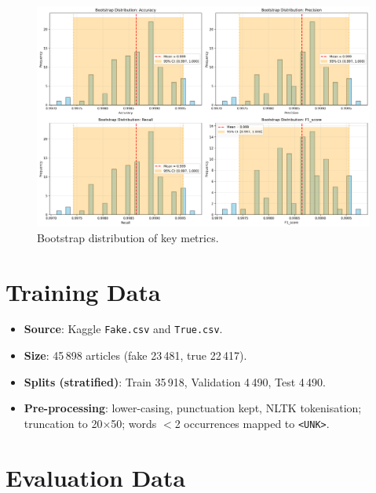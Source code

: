 \documentclass[11pt]{article}
\begin{document}
\begin{figure}[H]

\centering

\includegraphics[width=0.8\linewidth]{../plots/bootstrap_distributions.png}

\caption{Bootstrap distribution of key metrics.}

\end{figure}

  


\section{Training Data}

\begin{itemize}[leftmargin=*, label=--]

\item \textbf{Source}: Kaggle \texttt{Fake.csv} and \texttt{True.csv}.

\item \textbf{Size}: 45\,898 articles (fake 23\,481, true 22\,417).

\item \textbf{Splits (stratified)}: Train 35\,918, Validation 4\,490, Test 4\,490.

\item \textbf{Pre-processing}: lower-casing, punctuation kept, NLTK tokenisation; truncation to 20×50; words $<$2 occurrences mapped to \texttt{<UNK>}.

\end{itemize}

  


\section{Evaluation Data}
\end{document}
